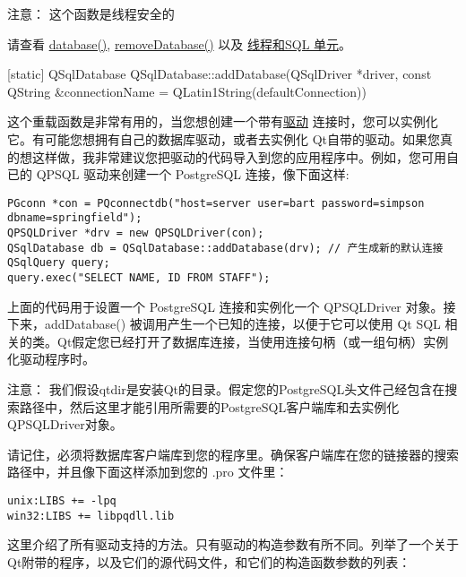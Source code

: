 注意： 这个函数是线程安全的

请查看 \href{https://github.com/QtDocumentCN/QtDocumentCN/blob/master/Src/S/QSqlDatabase/QSqlDatabase.md#static-qsqldatabase-qsqldatabasedatabaseconst-qstring-connectionname--qlatin1stringdefaultconnection-bool-open--true}{database()}, \href{https://github.com/QtDocumentCN/QtDocumentCN/blob/master/Src/S/QSqlDatabase/QSqlDatabase.md#static-void-qsqldatabaseremovedatabaseconst-qstring-connectionname}{removeDatabase()} 以及 \href{https://doc.qt.io/qt-5/threads-modules.html#threads-and-the-sql-module}{ 线程和SQL 单元}。

[static] QSqlDatabase QSqlDatabase::addDatabase(QSqlDriver *driver, const QString \&connectionName = QLatin1String(defaultConnection))

这个重载函数是非常有用的，当您想创建一个带有\href{https://doc.qt.io/qt-5/qsqldriver.html}{驱动} 连接时，您可以实例化它。有可能您想拥有自己的数据库驱动，或者去实例化 Qt自带的驱动。如果您真的想这样做，我非常建议您把驱动的代码导入到您的应用程序中。例如，您可用自已的 QPSQL 驱动来创建一个 PostgreSQL 连接，像下面这样:

\begin{lstlisting}
PGconn *con = PQconnectdb("host=server user=bart password=simpson dbname=springfield");
QPSQLDriver *drv = new QPSQLDriver(con);
QSqlDatabase db = QSqlDatabase::addDatabase(drv); // 产生成新的默认连接
QSqlQuery query;
query.exec("SELECT NAME, ID FROM STAFF");	
\end{lstlisting}

上面的代码用于设置一个 PostgreSQL 连接和实例化一个 QPSQLDriver 对象。接下来，addDatabase() 被调用产生一个已知的连接，以便于它可以使用 Qt SQL 相关的类。Qt假定您已经打开了数据库连接，当使用连接句柄（或一组句柄）实例化驱动程序时。

注意： 我们假设qtdir是安装Qt的目录。假定您的PostgreSQL头文件己经包含在搜索路径中，然后这里才能引用所需要的PostgreSQL客户端库和去实例化QPSQLDriver对象。

请记住，必须将数据库客户端库到您的程序里。确保客户端库在您的链接器的搜索路径中，并且像下面这样添加到您的 .pro 文件里：

\begin{lstlisting}
unix:LIBS += -lpq
win32:LIBS += libpqdll.lib
\end{lstlisting}

这里介绍了所有驱动支持的方法。只有驱动的构造参数有所不同。列举了一个关于 Qt附带的程序，以及它们的源代码文件，和它们的构造函数参数的列表：

